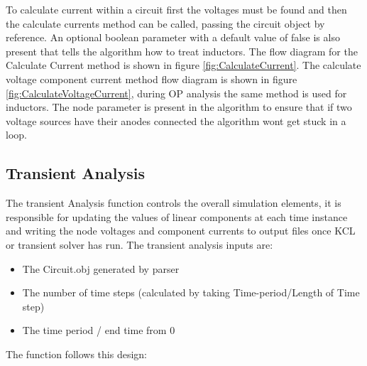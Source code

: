 \documentclass{article}
\begin{document}
To calculate current within a circuit first the voltages must be found and then the calculate currents method can be called, passing the circuit object by reference. An optional boolean parameter with a default value of false is also present that tells the algorithm how to treat inductors. The flow diagram for the Calculate Current method is shown in figure \ref{fig:CalculateCurrent}. The calculate voltage component current method flow diagram is shown in figure \ref{fig:CalculateVoltageCurrent}, during OP analysis the same method is used for inductors. The node parameter is present in the algorithm to ensure that if two voltage sources have their anodes connected the algorithm wont get stuck in a loop. 


\newpage



\subsection{Transient Analysis}
The transient Analysis function controls the overall simulation elements, it is responsible for updating the values of linear components at each time instance and writing the node voltages and component currents to output files once KCL or transient solver has run. The transient analysis inputs are: 
\begin{itemize}
    \item The Circuit.obj generated by parser
    \item The number of time steps (calculated by taking Time-period/Length of Time step) 
    \item The time period / end time from 0 
\end{itemize}
The function follows this design:
\end{document}
